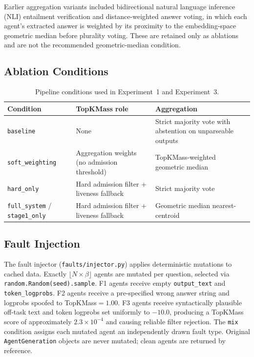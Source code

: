\documentclass[11pt]{article}
\begin{document}
Earlier aggregation variants included bidirectional natural language inference
(NLI) entailment verification and distance-weighted answer voting, in which each
agent's extracted answer is weighted by its proximity to the embedding-space
geometric median before plurality voting. These are retained only as ablations
and are not the recommended geometric-median condition.

\subsection{Ablation Conditions}
\label{sec:conditions}

\begin{table}[h]
\centering
\caption{Pipeline conditions used in Experiment~1 and Experiment~3.}
\label{tab:conditions}
\small
\begin{tabular}{lp{4.5cm}p{5cm}}
\toprule
\textbf{Condition} & \textbf{TopKMass role} & \textbf{Aggregation} \\
\midrule
\texttt{baseline}
  & None
  & Strict majority vote with abstention on unparseable outputs \\[4pt]
\texttt{soft\_weighting}
  & Aggregation weights (no admission threshold)
  & TopKMass-weighted geometric median \\[4pt]
\texttt{hard\_only}
  & Hard admission filter + liveness fallback
  & Strict majority vote \\[4pt]
\texttt{full\_system} / \texttt{stage1\_only}
  & Hard admission filter + liveness fallback
  & Geometric median nearest-centroid \\
\bottomrule
\end{tabular}
\end{table}

\subsection{Fault Injection}
\label{sec:faults}

The fault injector (\texttt{faults/injector.py}) applies deterministic mutations
to cached data. Exactly $\lfloor N \times \beta \rfloor$ agents are mutated per
question, selected via \texttt{random.Random(seed).sample}. F1 agents receive
empty \texttt{output\_text} and \texttt{token\_logprobs}. F2 agents receive a
pre-specified wrong answer string and logprobs spoofed to TopKMass$=1.00$. F3
agents receive syntactically plausible off-task text and token logprobs set
uniformly to $-10.0$, producing a TopKMass score of approximately
$2.3\times10^{-4}$ and causing reliable filter rejection. The \texttt{mix}
condition assigns each mutated agent an independently drawn fault type. Original
\texttt{AgentGeneration} objects are never mutated; clean agents are returned by
reference.
\end{document}
